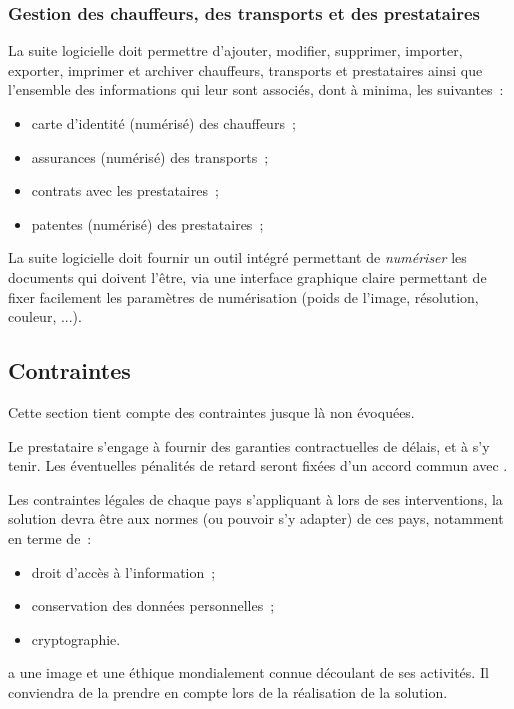 \subsubsection{Gestion des chauffeurs, des transports et des prestataires}
La suite logicielle doit permettre d'ajouter, modifier, supprimer, importer, exporter, imprimer et archiver chauffeurs, transports et prestataires ainsi que l'ensemble des informations qui leur sont associés, dont à minima, les suivantes~:
\begin{itemize}
	\item carte d'identité (numérisé) des chauffeurs~;
	\item assurances (numérisé) des transports~;
	\item contrats avec les prestataires~;
	\item patentes (numérisé) des prestataires~;
\end{itemize}
\begin{constraint}
	La suite logicielle doit fournir un outil intégré permettant de \emph{numériser} les documents qui doivent l'être, via une interface graphique claire permettant de fixer facilement les paramètres de numérisation (poids de l'image, résolution, couleur, ...).
\end{constraint}

\subsection{Contraintes}
Cette section tient compte des contraintes jusque là non évoquées.
\begin{constraint}
	Le prestataire s'engage à fournir des garanties contractuelles de délais, et à s'y tenir.
	Les éventuelles pénalités de retard seront fixées d'un accord commun avec \mo.
\end{constraint}
\begin{constraint}
	Les contraintes légales de chaque pays s'appliquant à \mo lors de ses interventions, la solution devra être aux normes (ou pouvoir s'y adapter) de ces pays, notamment en terme de~:
	\begin{itemize}
		\item droit d'accès à l'information~;
		\item conservation des données personnelles~;
		\item cryptographie.
	\end{itemize}
\end{constraint}
\begin{constraint}
	\mo a une image et une éthique mondialement connue découlant de ses activités. Il conviendra de la prendre en compte lors de la réalisation de la solution.
\end{constraint}

